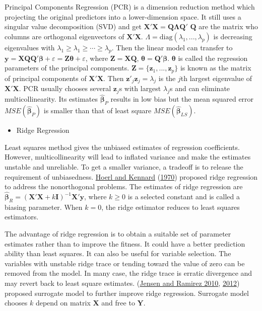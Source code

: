 \documentclass[
  11pt,
  openany]{memoir}
\providecommand{\tightlist}{%
  \setlength{\itemsep}{0pt}\setlength{\parskip}{0pt}}
\begin{document}
Principal Components Regression (PCR) is a dimension reduction method which projecting the original predictors into a lower-dimension space.
It still uses a singular value decomposition (SVD) and get \(\mathbf{X'X}=\mathbf{Q\Lambda Q}'\)
\(\mathbf{Q}\) are the matrix who columns are orthogonal eigenvectors of \(\mathbf{X'X}\). \(\Lambda=\text{diag}(\lambda_1,...,\lambda_p)\) is decreasing eigenvalues with \(\lambda_1\ge\lambda_1\ge\cdots\ge\lambda_p\). Then the linear model can transfer to
\(\mathbf{y} = \mathbf{XQQ}'\boldsymbol\beta + \varepsilon = \mathbf{Z}\boldsymbol\theta + \varepsilon\),
where \(\mathbf{Z}=\mathbf{XQ}\), \(\boldsymbol\theta=\mathbf{Q}'\boldsymbol\beta\).
\(\boldsymbol\theta\) is called the regression parameters of the principal components.
\(\mathbf{Z}=\{\mathbf{z}_1,...,\mathbf{z}_p\}\) is known as the matrix of principal components of \(\mathbf{X'X}\).
Then \(\mathbf{z}'_j\mathbf{z}_j=\lambda_j\) is the \(j\)th largest eigenvalue of \(\mathbf{X'X}\).
PCR usually chooses several \(\mathbf{z}_j\)s with largest \(\lambda_j\)s and can eliminate multicollinearity.
Its estimates \(\boldsymbol{\hat\beta}_{P}\) results in low bias but the mean squared error \(MSE(\boldsymbol{\hat\beta}_{P})\) is smaller than that of least square \(MSE(\boldsymbol{\hat\beta}_{LS})\).

\begin{itemize}
\tightlist
\item
  Ridge Regression
\end{itemize}

Least squares method gives the unbiased estimates of regression coefficients.
However, multicollinearity will lead to inflated variance and make the estimates unstable and unreliable.
To get a smaller variance, a tradeoff is to release the requirement of unbiasedness.
\protect\hyperlink{ref-hoerlRidgeRegressionBiased1970}{Hoerl and Kennard} (\protect\hyperlink{ref-hoerlRidgeRegressionBiased1970}{1970}) proposed ridge regression to address the nonorthogonal problems.
The estimates of ridge regression are \(\boldsymbol{\hat\beta}_{R}=(\mathbf{X'X}+k\mathbf{I})^{-1}\mathbf{X'}\mathbf{y}\),
where \(k\ge0\) is a selected constant and is called a biasing parameter. When \(k=0\), the ridge estimator reduces to least squares estimators.

The advantage of ridge regression is to obtain a suitable set of parameter estimates rather than to improve the fitness. It could have a better prediction ability than least squares.
It can also be useful for variable selection. The variables with unstable ridge trace or tending toward the value of zero can be removed from the model.
In many case, the ridge trace is erratic divergence and may revert back to least square estimates.
(\protect\hyperlink{ref-jensenSurrogateModelsIllconditioned2010a}{Jensen and Ramirez 2010}, \protect\hyperlink{ref-jensenVariationsRidgeTraces2012}{2012}) proposed surrogate model to further improve ridge regression. Surrogate model chooses \(k\) depend on matrix \(\mathbf{X}\) and free to \(\mathbf{Y}\).
\end{document}
